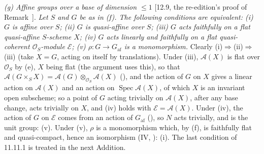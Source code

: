 \par\smallskip\noindent\textit{(g) Affine groups over a base of dimension \(\leq1\)} [12.9,
the re-edition's proof of Remark~]. \emph{Let \(S\) and
\(G\) be as in \textup{(f)}. The following conditions are equivalent: \textup{(i)} \(G\) is
affine over \(S\); \textup{(ii)} \(G\) is quasi-affine over \(S\); \textup{(iii)} \(G\) acts
faithfully on a flat quasi-affine \(S\)-scheme \(X\); \textup{(iv)} \(G\) acts linearly and
faithfully on a flat quasi-coherent \(\mathcal O_S\)-module \(\mathcal E\); \textup{(v)}
\(\rho:G\to G_{\mathrm{af}}\) is a monomorphism.} Clearly (i)\(\Rightarrow\)(ii)\(\Rightarrow\)(iii)
(take \(X=G\), acting on itself by translations). Under (iii), \(\mathcal A(X)\) is flat over
\(\mathcal O_S\) by (e), \(X\) being flat (the argument uses this), so that
\(\mathcal A(G\times_SX)=\mathcal A(G)\otimes_{\mathcal O_S}\mathcal A(X)\)
(), and the action of \(G\) on \(X\) gives a linear action
on \(\mathcal A(X)\) and an action on \(\operatorname{Spec}\mathcal A(X)\), of which \(X\) is an
invariant open subscheme; so a point of \(G\) acting trivially on \(\mathcal A(X)\), after any
base change, acts trivially on \(X\), and (iv) holds with \(\mathcal E=\mathcal A(X)\). Under
(iv), the action of \(G\) on \(\mathcal E\) comes from an action of \(G_{\mathrm{af}}\)
(), so \(N\) acts trivially, and is the unit group: (v).
Under (v), \(\rho\) is a monomorphism which, by (f), is faithfully flat and quasi-compact, hence
an isomorphism (IV, ): (i). The last condition of 11.11.1
is treated in the next Addition.

